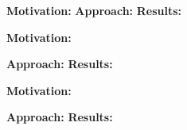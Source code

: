 
\rqi

\noindent \textbf{Motivation:} 
\noindent \textbf{Approach:} 
\noindent \textbf{Results:} 

\rqii

\noindent \textbf{Motivation:} 
\par \noindent \textbf{Approach:} 
\noindent \textbf{Results:} 


\rqiii

\noindent \textbf{Motivation:} 
\par \noindent \textbf{Approach:} 
\noindent \textbf{Results:} 



